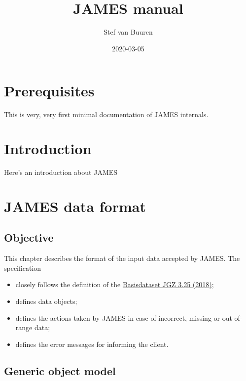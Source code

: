 \documentclass[]{book}
\title{JAMES manual}
\author{Stef van Buuren}
\date{2020-03-05}
\providecommand{\tightlist}{%
  \setlength{\itemsep}{0pt}\setlength{\parskip}{0pt}}
\begin{document}
\maketitle

{
\setcounter{tocdepth}{1}
\tableofcontents
}
\hypertarget{prerequisites}{%
\chapter{Prerequisites}\label{prerequisites}}

This is very, very first minimal documentation of JAMES internals.

\hypertarget{intro}{%
\chapter{Introduction}\label{intro}}

Here's an introduction about JAMES

\hypertarget{james-data-format}{%
\chapter{JAMES data format}\label{james-data-format}}

\hypertarget{objective}{%
\section{Objective}\label{objective}}

This chapter describes the format of the input data accepted by JAMES. The specification

\begin{itemize}
\tightlist
\item
  closely follows the definition of the \href{https://www.ncj.nl/themadossiers/informatisering/basisdataset/}{Basisdataset JGZ 3.25 (2018)};
\item
  defines data objects;
\item
  defines the actions taken by JAMES in case of incorrect, missing or out-of-range data;
\item
  defines the error messages for informing the client.
\end{itemize}

\hypertarget{generic-object-model}{%
\section{Generic object model}\label{generic-object-model}}
\end{document}
